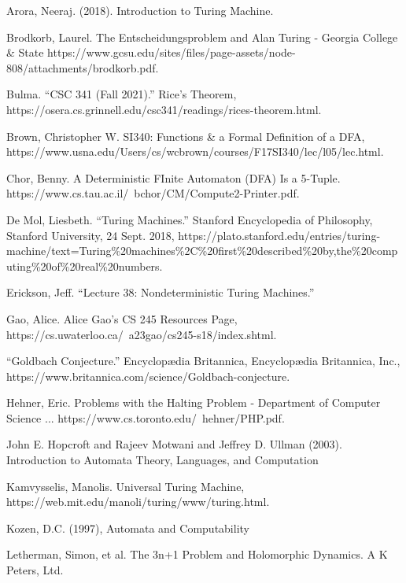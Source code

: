 \documentclass[12pt, letterpaper]{article}
\begin{document}
\begin{thebibliography}{book}

 

 Arora, Neeraj. (2018). Introduction to Turing Machine. 

 Brodkorb, Laurel. The Entscheidungsproblem and Alan Turing - Georgia College \& State https://www.gcsu.edu/sites/files/page-assets/node-808/attachments/brodkorb.pdf. 

 Bulma. “CSC 341 (Fall 2021).” Rice's Theorem, https://osera.cs.grinnell.edu/csc341/readings/rices-theorem.html. 

 Brown, Christopher W. SI340: Functions \& a Formal Definition of a DFA, https://www.usna.edu/Users/cs/wcbrown/courses/F17SI340/lec/l05/lec.html. 

 Chor, Benny. A Deterministic FInite Automaton (DFA) Is a 5-Tuple. https://www.cs.tau.ac.il/~bchor/CM/Compute2-Printer.pdf. 

De Mol, Liesbeth. “Turing Machines.” Stanford Encyclopedia of Philosophy, Stanford University, 24 Sept. 2018, https://plato.stanford.edu/entries/turing-machine/text=Turing\%20machines\%2C\%20first\%20described\%20by,the\%20computing\%20of\%20real\%20numbers. 

 Erickson, Jeff. “Lecture 38: Nondeterministic Turing Machines.” 

 Gao, Alice. Alice Gao's CS 245 Resources Page, https://cs.uwaterloo.ca/~a23gao/cs245-s18/index.shtml. 

 “Goldbach Conjecture.” Encyclopædia Britannica, Encyclopædia Britannica, Inc., https://www.britannica.com/science/Goldbach-conjecture.

 Hehner, Eric. Problems with the Halting Problem - Department of Computer Science ... https://www.cs.toronto.edu/~hehner/PHP.pdf. 

 John E. Hopcroft and Rajeev Motwani and Jeffrey D. Ullman (2003). Introduction to Automata Theory, Languages, and Computation

 Kamvysselis, Manolis. Universal Turing Machine, https://web.mit.edu/manoli/turing/www/turing.html. 

 Kozen, D.C. (1997), Automata and Computability



 Letherman, Simon, et al. The 3n+1 Problem and Holomorphic Dynamics. A K Peters, Ltd. 


\end{thebibliography}
\end{document}
